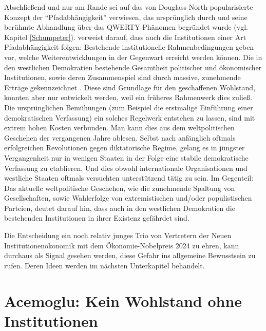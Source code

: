 Abschließend und nur am Rande sei auf das von Douglass North popularisierte Konzept der "`Pfadabhängigkeit"' verwiesen, das ursprünglich durch \textcite{David1985} und seine berühmte Abhandlung über das QWERTY-Phänomen begründet wurde (vgl. Kapitel \ref{Schumpeter}). \textcite[S. 109]{North1991} verweist darauf, dass auch die Institutionen einer Art Pfadabhängigkeit folgen: Bestehende institutionelle Rahmenbedingungen geben vor, welche Weiterentwicklungen in der Gegenwart erreicht werden können. Die in den westlichen Demokratien bestehende Gesamtheit politischer und ökonomischer Institutionen, sowie deren Zusammenspiel sind durch massive, zunehmende Erträge gekennzeichnet \parencite[S. 109]{North1991}. Diese sind Grundlage für den geschaffenen Wohlstand, konnten aber nur entwickelt werden, weil ein früheres Rahmenwerk dies zuließ. Die ursprünglichen Bemühungen (zum Beispiel die erstmalige Einführung einer demokratischen Verfassung) ein solches Regelwerk entstehen zu lassen, sind mit extrem hohen Kosten verbunden. Man kann dies aus dem weltpolitischen Geschehen der vergangenen Jahre ablesen. Selbst nach anfänglich oftmals erfolgreichen Revolutionen gegen diktatorische Regime, gelang es in jüngster Vergangenheit nur in wenigen Staaten in der Folge eine stabile demokratische Verfassung zu etablieren. Und dies obwohl internationale Organisationen und westliche Staaten oftmals versuchten unterstützend tätig zu sein. Im Gegenteil: Das aktuelle weltpolitische Geschehen, wie die zunehmende Spaltung von Gesellschaften, sowie Wahlerfolge von extremistischen und/oder populistischen Parteien, deutet darauf hin, dass auch in den westlichen Demokratien die bestehenden Institutionen in ihrer Existenz gefährdet sind. 

Die Entscheidung ein noch relativ junges Trio von Vertretern der Neuen Institutionenökonomik mit dem Ökonomie-Nobelpreis 2024 zu ehren, kann durchaus als Signal gesehen werden, diese Gefahr ins allgemeine Bewusstsein zu rufen. Deren Ideen werden im nächsten Unterkapitel behandelt.


\section{Acemoglu: Kein Wohlstand ohne Institutionen}
\label{Acemoglu}

